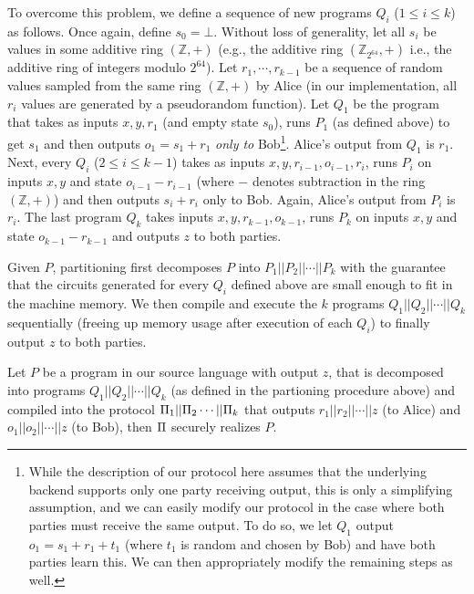 To overcome this problem, we define a sequence of new programs $Q_i$ ($1\leq i\leq k$) as follows. Once again, define $s_0 = \bot$. Without loss of generality, let all $s_i$ be values in some additive ring $(\mathbb{Z},+)$ (e.g., the additive ring $(\mathbb{Z}_{2^{64}},+)$ i.e., the additive ring of integers modulo $2^{64}$). 
Let $r_1,\cdots,r_{k-1}$ be a sequence of random values sampled from the same ring $(\mathbb{Z},+)$ by Alice (in our implementation, all $r_i$ values are generated by a pseudorandom function). Let $Q_1$ be the program that takes as inputs $x,y, r_1$ (and empty state $s_0$), runs $P_1$ (as defined above) to get $s_1$ and then outputs $o_1 = s_1 + r_1$ {\em only to} Bob\footnote{While the description of our protocol here assumes that the underlying backend supports only one party receiving output, this is only a simplifying assumption, and we can easily modify our protocol in the case where both parties must receive the same output. To do so, we let $Q_1$ output $o_1 = s_1+r_1+t_1$ (where $t_1$ is random and chosen by Bob) and have both parties learn this. We can then appropriately modify the remaining steps as well.}. Alice's output from $Q_1$ is $r_1$. Next, every $Q_i$ ($2\leq i\leq k-1$) takes as inputs $x,y,r_{i-1},o_{i-1},r_i$, runs $P_i$ on inputs $x,y$ and state $o_{i-1}-r_{i-1}$ (where $-$ denotes subtraction in the ring $(\mathbb{Z},+)$) and then outputs $s_i+r_i$ only to Bob. Again, Alice's output from $P_i$ is $r_i$. The last program $Q_k$ takes inputs $x,y,r_{k-1},o_{k-1}$, runs $P_k$ on inputs $x,y$ and state $o_{k-1}-r_{k-1}$ and outputs $z$ to both parties.

Given $P$, partitioning first decomposes $P$ into $P_1||P_2||\cdots||P_k$ with the guarantee that the circuits generated for every $Q_i$ defined above are small enough to fit in the machine memory. We then compile and execute the $k$ programs $Q_1||Q_2||\cdots||Q_k$ sequentially (freeing up memory usage after  execution of each $Q_i$) to finally output $z$ to both parties.

\begin{theorem}
Let $P$ be a program in our source language with output $z$, that is decomposed into programs $Q_1||Q_2||\cdots ||Q_k$ (as defined in the partioning procedure above) and compiled into the protocol $\Pi_1||\Pi_2\cdots ||\Pi_k$ that outputs $r_1||r_2||\cdots||z$ (to Alice) and $o_1||o_2||\cdots||z$ (to Bob), then $\Pi$ securely realizes $P$.  
\end{theorem}

